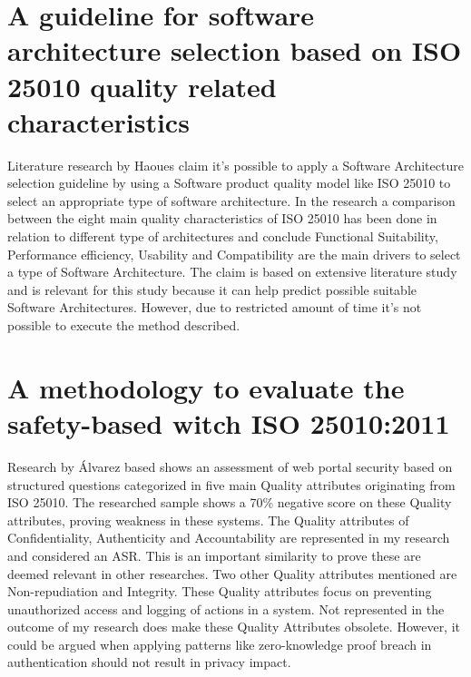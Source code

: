 \section*{A guideline for software architecture selection based on ISO 25010 quality related characteristics}
Literature research by Haoues \etal \cite{Haoues2017AGF} claim it's possible to apply a Software Architecture selection guideline by using a Software product quality model like ISO 25010 to select an appropriate type of software architecture. In the research a comparison between the eight main quality characteristics of ISO 25010 has been done in relation to different type of architectures and conclude Functional Suitability, Performance efficiency, Usability and Compatibility are the main drivers to select a type of Software Architecture. The claim is based on extensive literature study and is relevant for this study because it can help predict possible suitable Software Architectures. However, due to restricted amount of time it's not possible to execute the method described. 

\section*{A methodology to evaluate the safety-based witch ISO 25010:2011}
Research by {\'A}lvarez \etal \cite{Mexlvarez2021AMT} based shows an assessment of web portal security based on structured questions categorized in five main Quality attributes originating from ISO 25010. The researched sample shows a 70\% negative score on these Quality attributes, proving weakness in these systems. The Quality attributes of Confidentiality, Authenticity and Accountability are represented in my research and considered an ASR. This is an important similarity to prove these are deemed relevant in other researches. Two other Quality attributes mentioned are Non-repudiation and Integrity. These Quality attributes focus on preventing unauthorized access and logging of actions in a system. Not represented in the outcome of my research does make these Quality Attributes obsolete. However, it could be argued when applying patterns like zero-knowledge proof breach in authentication should not result in privacy impact. 
